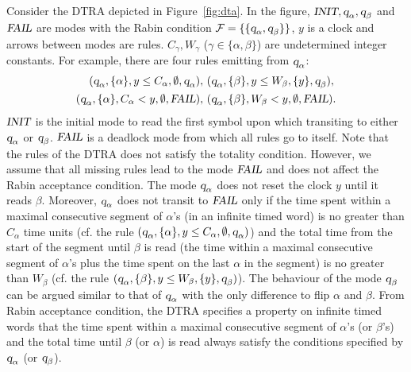 \begin{example}\label{ex:dta}
Consider the DTRA depicted in Figure~\ref{fig:dta}.
In the figure, $\mbox{\sl INIT},\mbox{\sl q}_{\alpha},\mbox{\sl q}_{\beta}$ and $\mbox{\sl FAIL}$ are modes with the Rabin condition
$
    \mathcal{F}
    =
    \{
        \{
            \mbox{\sl q}_{\alpha},
            \mbox{\sl q}_{\beta}
        \}
    \}
$, $y$ is a clock and arrows between modes are rules.
$C_\gamma,W_\gamma$ ($\gamma\in\{\alpha,\beta\}$) are undetermined integer constants. 
For example, there are four rules emitting from $\mbox{\sl q}_{\alpha}$:
\begin{align*}
(\mbox{\sl q}_{\alpha}, \{ \alpha \}, y \le C_\alpha,\emptyset, \mbox{\sl q}_{\alpha}),& ~(\mbox{\sl q}_{\alpha}, \{ \beta \}, y \le W_\beta, \{ y \}, \mbox{\sl q}_{\beta}),\\
(\mbox{\sl q}_{\alpha}, \{ \alpha \}, C_\alpha<y,\emptyset, \mbox{\sl FAIL}),& ~(\mbox{\sl q}_{\alpha}, \{ \beta \}, W_\beta<y, \emptyset, \mbox{\sl FAIL}).
\end{align*}
$\mbox{\sl INIT}$ is the initial mode to read the first symbol upon which transiting to either $\mbox{\sl q}_{\alpha}$ or $\mbox{\sl q}_{\beta}$.
$\mbox{\sl FAIL}$ is a deadlock mode from which all rules go to itself.
Note that the rules of the DTRA does not satisfy the totality condition. 
However, we assume that all missing rules lead to the mode $\mbox{\sl FAIL}$ and does not affect the Rabin acceptance condition. 
The mode $\mbox{\sl q}_{\alpha}$ does not reset the clock $y$ until it reads $\beta$.
Moreover, $\mbox{\sl q}_{\alpha}$ does not transit to $\mbox{\sl FAIL}$ only if the time spent within a maximal consecutive segment of $\alpha$'s (in an infinite timed word) is no greater than $C_\alpha$ time units (cf. the rule $(\mbox{\sl q}_{\alpha}, \{ \alpha \}, y \le C_\alpha,\emptyset, \mbox{\sl q}_{\alpha})$) and the total time from the start of the segment until $\beta$ is read (the time within a maximal consecutive segment of $\alpha$'s plus the time spent on the last $\alpha$ in the segment) is no greater than $W_\beta$
(cf. the rule $(\mbox{\sl q}_{\alpha}, \{ \beta \}, y \le W_\beta, \{ y \}, \mbox{\sl q}_{\beta})$). 
The behaviour of the mode $\mbox{\sl q}_{\beta}$ can be argued similar to that of $\mbox{\sl q}_{\alpha}$ with the only difference to 
flip $\alpha$ and $\beta$.
From Rabin acceptance condition, the DTRA specifies a property on infinite timed words that the time spent within a maximal consecutive segment of $\alpha$'s (or $\beta$'s) and the total time until $\beta$ (or $\alpha$) is read
always satisfy the conditions specified by $\mbox{\sl q}_{\alpha}$ (or $\mbox{\sl q}_{\beta}$). 
\end{example}

